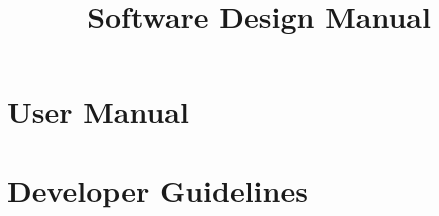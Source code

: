 \documentclass[10pt,a4paper]{book}
\title{Software Design Manual}
\date{} %
\begin{document}
    
    \maketitle
    \tableofcontents
    
    
    
    \part{User Manual}
    
    
    \newcommand\home{../doc}
    
    
        \part{Developer Guidelines}
        
    
    \renewcommand\home{../doc}
    
    
\end{document}
